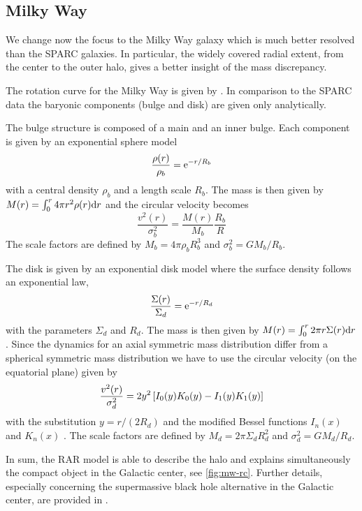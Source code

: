\subsection{Milky Way}
\label{sec:mw}
We change now the focus to the Milky Way galaxy which is much better resolved than the SPARC galaxies. In particular, the widely covered radial extent, from the center to the outer halo, gives a better insight of the mass discrepancy.

The rotation curve for the Milky Way is given by \citet{2013PASJ...65..118S}. In comparison to the SPARC data the baryonic components (bulge and disk) are given only analytically.

The bulge structure is composed of a main and an inner bulge. Each component is given by an exponential sphere model \begin{equation}
	\frac{\rho(r)}{\rho_b} = \e^{-r/R_b}
\end{equation} with a central density $\rho_b$ and a length scale $R_b$. The mass is then given by $M(r) = \int_0^r 4\pi r^2 \rho(r) \mathrm{d} r$ and the circular velocity becomes \begin{equation}
	\frac{v^2(r)}{\sigma_b^2} = \frac{M(r)}{M_b} \frac{R_b}{R}
\end{equation} The scale factors are defined by $M_b = 4\pi \rho_b R_b^3$ and $\sigma_b^2 = G M_b/R_b$.

The disk is given by an exponential disk model where the surface density follows an exponential law, \begin{equation}
	\frac{\Sigma(r)}{\Sigma_d} = \e^{-r/R_d}
\end{equation} with the parameters $\Sigma_d$ and $R_d$. The mass is then given by $M(r) = \int_0^r 2\pi r \Sigma(r) \mathrm{d} r$. Since the dynamics for an axial symmetric mass distribution differ from a spherical symmetric mass distribution we have to use the circular velocity (on the equatorial plane) given by \begin{equation}
	\frac{v^2(r)}{\sigma_d^2} = 2 y^2 \qbracket{I_0(y) K_0(y) - I_1(y) K_1(y)}
\end{equation} with the substitution $y = r/(2R_d)$ and the modified Bessel functions $I_n(x)$ and $K_n(x)$ \citep{Binney2008}. The scale factors are defined by $M_d = 2\pi \Sigma_d R_d^2$ and $\sigma_d^2 = G M_d/R_d$.




In sum, the RAR model is able to describe the halo and explains simultaneously the compact object in the Galactic center, see \cref{fig:mw-rc}. Further details, especially concerning the supermassive black hole alternative in the Galactic center, are provided in \cite{arguelles_novel_2018}.

